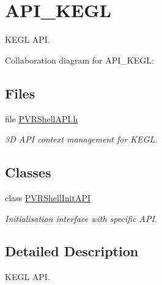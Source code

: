 \hypertarget{group___a_p_i___k_e_g_l}{\section{A\+P\+I\+\_\+\+K\+E\+G\+L}
\label{group___a_p_i___k_e_g_l}
}


K\+E\+G\+L A\+P\+I.  


Collaboration diagram for A\+P\+I\+\_\+\+K\+E\+G\+L\+:
\subsection*{Files}
\begin{DoxyCompactItemize}
\item 
file \hyperlink{_k_e_g_l_2_p_v_r_shell_a_p_i_8h}{P\+V\+R\+Shell\+A\+P\+I.\+h}
\begin{DoxyCompactList}\small\item\em 3\+D A\+P\+I context management for K\+E\+G\+L. \end{DoxyCompactList}\end{DoxyCompactItemize}
\subsection*{Classes}
\begin{DoxyCompactItemize}
\item 
class \hyperlink{class_p_v_r_shell_init_a_p_i}{P\+V\+R\+Shell\+Init\+A\+P\+I}
\begin{DoxyCompactList}\small\item\em Initialisation interface with specific A\+P\+I. \end{DoxyCompactList}\end{DoxyCompactItemize}


\subsection{Detailed Description}
K\+E\+G\+L A\+P\+I. 



